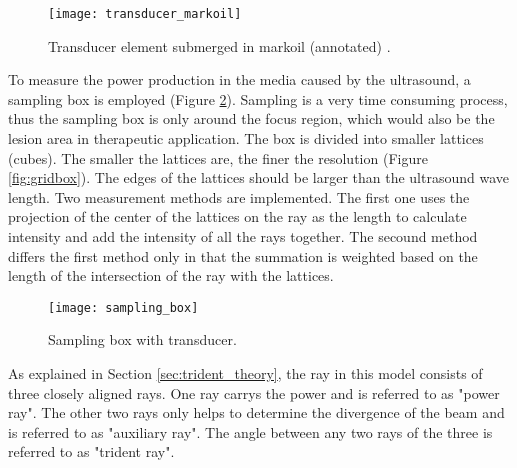 \begin{figure}[h]
    \centering
    \texttt{[image: transducer\_markoil]}
    \caption{Transducer element submerged in markoil (annotated) \cite{sonalleve} \cite{vanwijk2013}.}
    \label{fig:submerged_transducer}
\end{figure}

To measure the power production in the media caused by the ultrasound, a sampling box is employed (Figure \ref{fig:sampling_box}). Sampling is a very time consuming process, thus the sampling box is only around the focus region, which would also be the lesion area in therapeutic application. The box is divided into smaller lattices (cubes). The smaller the lattices are, the finer the resolution (Figure \ref{fig:gridbox}). The edges of the lattices should be larger than the ultrasound wave length. Two measurement methods are implemented. The first one uses the projection of the center of the lattices on the ray as the length to calculate intensity and add the intensity of all the rays together. The secound method differs the first method only in that the summation is weighted based on the length of the intersection of the ray with the lattices.

\begin{figure}[h]
    \centering
    \texttt{[image: sampling\_box]}
    \caption{Sampling box with transducer.}
    \label{fig:sampling_box}
\end{figure}

As explained in Section \ref{sec:trident_theory}, the ray in this model consists of three closely aligned rays. One ray carrys the power and is referred to as "power ray". The other two rays only helps to determine the divergence of the beam and is referred to as "auxiliary ray". The angle between any two rays of the three is referred to as "trident ray".

